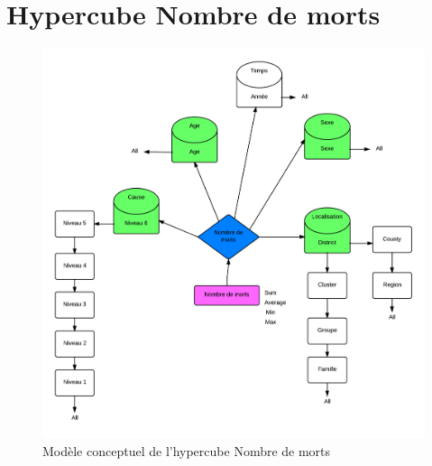\section{Hypercube Nombre de morts}
\begin{figure}[h]
    \centering
    \includegraphics[width=\linewidth]{images/cubeNbMorts.png}
    \caption{Modèle conceptuel de l'hypercube Nombre de morts}
    \label{conception_cube_nombre_morts}
\end{figure}

\pagebreak

